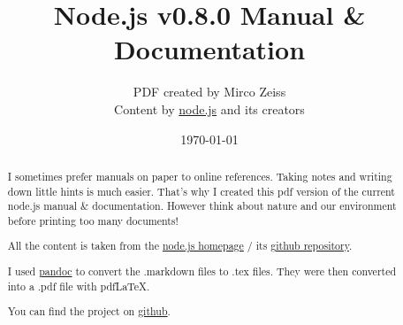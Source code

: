 \documentclass[10pt, a4paper, titlepage, oneside, plain]{article}
\begin{document}
	\title{Node.js v0.8.0 Manual \& Documentation}
	\author{PDF created by Mirco Zeiss\\Content by \href{http://www.nodejs.org}{node.js} and its creators}
	\date{\today}

	\maketitle

	\begin{abstract}
		I sometimes prefer manuals on paper to online references. Taking notes and writing down little hints is much easier. That's why I created this pdf version of the current node.js manual \& documentation. However think about nature and our environment before printing too many documents!

	All the content is taken from the \href{http://www.nodejs.org}{node.js homepage} / its \href{https://github.com/joyent/node}{github repository}.

	I used \href{http://johnmacfarlane.net/pandoc/}{pandoc} to convert the .markdown files to .tex files. They were then converted into a .pdf file with pdfLaTeX.

	You can find the project on \href{https://github.com/zeMirco/nodejs-pdf-docs}{github}.
	\end{abstract}

	\tableofcontents

	
	
	
	
	
	
	
	
	
	
	
	
	
	
				
	
					
	
	
	
	
	
	
	
	
	\appendix
		
\end{document}
